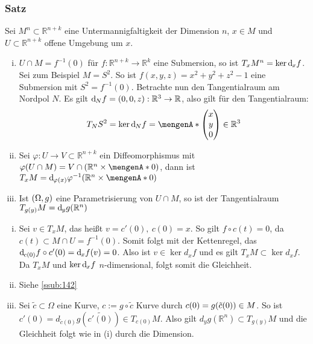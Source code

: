 \subsubsection{Satz}
\label{ssub:127}
Sei $M^n\subset \mathds{R}^{n+k}$ eine Untermannigfaltigkeit der Dimension $n$, $x\in M$ und $U\subset \mathds{R}^{n+k}$ offene Umgebung um $x$.
\begin{enumerate}[(i)]
\item $U\cap M = f^{-1}(0)$ für $f:\mathds{R}^{n+k} \to \mathds{R}^k$ eine Submersion, so ist $T_x M^n = \ker \mathrm{d}\mkern-1.0mu_x f$.\\
Sei zum Beispiel $M = S^2$. So ist $f(x,y,z)=x^2+y^2+z^2-1$ eine Submersion mit $S^2 = f^{-1}(0)$. Betrachte nun den Tangentialraum am Nordpol $N$. Es gilt $\mathrm{d}\mkern-1.0mu_N f = (0,0,z): \mathbb{R}^3 \to \mathbb{R}$, also gilt für den Tangentialraum: 
\[
T_N S^2 = \ker \mathd_N f = \set{
\begin{pmatrix}
x\\
y\\
0
\end{pmatrix}
\in \mathds{R}^3}
\]
\item Sei $\varphi: U\to V\subset \mathds{R}^{n+k}$ ein Diffeomorphismus mit $\varphi(U\cap M) = V\cap (\mathds{R}^n \times \set{0})$, dann ist $T_x M = \mathd_{\varphi(x)} \varphi^{-1}(\mathds{R}^n \times \set{0})$
\item Ist $(\Omega,g)$ eine Parametrisierung von $U\cap M$, so ist der Tangentialraum $T_{g(y)} M = \mathrm{d}\mkern-1.0mu_y g(\mathbb{R}^n)$
\end{enumerate} 
\begin{enumerate}[(i)]
\item Sei $v\in T_x M$, das heißt $v = c'(0),\ c(0) = x$. So gilt $f\circ c(t) = 0$, da $c(t)\subset M\cap U = f^{-1}(0)$. Somit folgt mit der Kettenregel, das $\mathrm{d}\mkern-1.0mu_{c(0)} f \circ c'(0) = \mathrm{d}\mkern-1.0mu_x f(v) = 0$. Also ist $v\in \ker d_x f$ und es gilt $T_x M \subset \ker d_x f$. Da $T_x M$ und $\ker \mathrm{d}\mkern-1.0mu_x f$ $n$-dimensional, folgt somit die Gleichheit.
\item Siehe \ref{ssub:142}
\item Sei $\tilde{c}\subset \Omega$ eine Kurve, $c := g\circ \tilde{c}$ Kurve durch $c(0) = g\enbrace*{\tilde{c}(0)}\in M$. So ist $c'(0) = d_{\tilde{c}(0)} g(\tilde{c'(0)})\in T_{c(0)} M$. Also gilt $d_y g(\mathds{R}^n) \subset T_{g(y)} M$ und die Gleichheit folgt wie in (i) durch die Dimension.
\end{enumerate}


